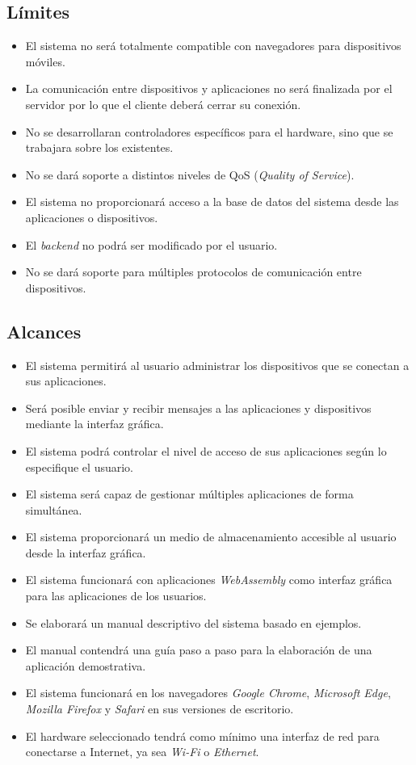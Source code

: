 \subsection{Límites}
\begin{itemize}
	\item El sistema no será totalmente compatible con navegadores para dispositivos móviles.
	\item La comunicación entre dispositivos y aplicaciones no será finalizada por el servidor por lo que el cliente deberá cerrar su conexión.
	\item No se desarrollaran controladores específicos para el hardware, sino que se trabajara sobre los existentes.
	\item No se dará soporte a distintos niveles de QoS (\textit{Quality of Service}).
	\item El sistema no proporcionará acceso a la base de datos del sistema desde las aplicaciones
o dispositivos.
	\item El \textit{backend} no podrá ser modificado por el usuario.
	\item No se dará soporte para múltiples protocolos de comunicación entre dispositivos.
\end{itemize}
\subsection{Alcances}

\begin{itemize}
	\item El sistema permitirá al usuario administrar los dispositivos que se conectan a sus aplicaciones.
	\item Será posible enviar y recibir mensajes a las aplicaciones y dispositivos mediante la interfaz gráfica.
	\item El sistema podrá controlar el nivel de acceso de sus aplicaciones según lo especifique el usuario.
	\item El sistema será capaz de gestionar múltiples aplicaciones de forma simultánea.
	\item El sistema proporcionará un medio de almacenamiento accesible al usuario desde la interfaz gráfica.
	\item El sistema funcionará con aplicaciones \textit{WebAssembly} como interfaz gráfica para las aplicaciones de los usuarios.
    \item Se elaborará un manual descriptivo del sistema basado en ejemplos.
    \item El manual contendrá una guía paso a paso para la elaboración de una aplicación demostrativa.
    \item El sistema funcionará en los navegadores \textit{Google Chrome}, \textit{Microsoft Edge}, \textit{Mozilla Firefox}
y \textit{Safari} en sus versiones de escritorio.
    \item El hardware seleccionado tendrá como mínimo una interfaz de red para conectarse a Internet,
ya sea \textit{Wi-Fi} o \textit{Ethernet}.
\end{itemize}
